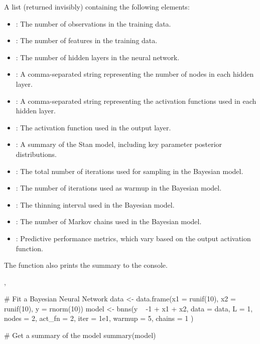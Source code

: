 \documentclass[a4paper]{book}
\begin{document}
\begin{Value}
A list (returned invisibly) containing the following elements:
\begin{itemize}

\item{} : The number of observations in the training data.
\item{} : The number of features in the training data.
\item{} : The number of hidden layers in the neural network.
\item{} : A comma-separated string representing the number of nodes in each hidden layer.
\item{} : A comma-separated string representing the activation functions used in each hidden layer.
\item{} : The activation function used in the output layer.
\item{} : A summary of the Stan model, including key parameter posterior distributions.
\item{} : The total number of iterations used for sampling in the Bayesian model.
\item{} : The number of iterations used as warmup in the Bayesian model.
\item{} : The thinning interval used in the Bayesian model.
\item{} : The number of Markov chains used in the Bayesian model.
\item{} : Predictive performance metrics, which vary based on the output activation function.

\end{itemize}

The function also prints the summary to the console.
\end{Value}
%
\begin{SeeAlso}
, 
\end{SeeAlso}
%
\begin{Examples}
\begin{ExampleCode}

# Fit a Bayesian Neural Network
data <- data.frame(x1 = runif(10), x2 = runif(10), y = rnorm(10))
model <- bnns(y ~ -1 + x1 + x2,
  data = data, L = 1, nodes = 2, act_fn = 2,
  iter = 1e1, warmup = 5, chains = 1
)

# Get a summary of the model
summary(model)

\end{ExampleCode}
\end{Examples}
\end{document}
